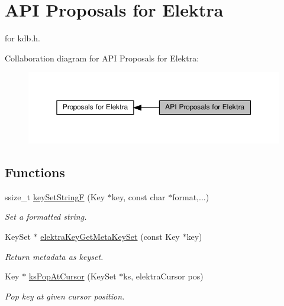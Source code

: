 \hypertarget{group__api}{}\section{A\+PI Proposals for Elektra}
\label{group__api}


for kdb.\+h.  


Collaboration diagram for A\+PI Proposals for Elektra\+:
\nopagebreak
\begin{figure}[H]
\begin{center}
\leavevmode
\includegraphics[width=350pt]{group__api}
\end{center}
\end{figure}
\subsection*{Functions}
\begin{DoxyCompactItemize}
\item 
ssize\+\_\+t \hyperlink{group__api_ga812eb6c4f506dafa5733bf531c52199c}{key\+Set\+StringF} (Key $\ast$key, const char $\ast$format,...)
\begin{DoxyCompactList}\small\item\em Set a formatted string. \end{DoxyCompactList}\item 
Key\+Set $\ast$ \hyperlink{group__api_ga48120f254e09e0c5cceff4864f110ceb}{elektra\+Key\+Get\+Meta\+Key\+Set} (const Key $\ast$key)
\begin{DoxyCompactList}\small\item\em Return metadata as keyset. \end{DoxyCompactList}\item 
Key $\ast$ \hyperlink{group__api_ga144904407e2014d5d597c10f4041738e}{ks\+Pop\+At\+Cursor} (Key\+Set $\ast$ks, elektra\+Cursor pos)
\begin{DoxyCompactList}\small\item\em Pop key at given cursor position. \end{DoxyCompactList}\end{DoxyCompactItemize}



